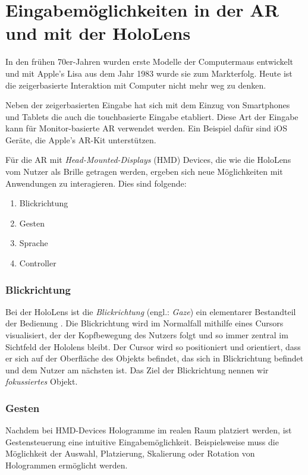 \section{Eingabemöglichkeiten in der AR und mit der HoloLens}
\label{sec:interaction-hololens}

In den frühen 70er-Jahren wurden erste Modelle der Computermaus entwickelt und mit Apple's Lisa aus dem Jahr 1983 wurde sie zum Markterfolg. Heute ist die zeigerbasierte Interaktion mit Computer nicht mehr weg zu denken.

Neben der zeigerbasierten Eingabe hat sich mit dem Einzug von Smartphones und Tablets die auch die touchbasierte Eingabe etabliert. Diese Art der Eingabe kann für Monitor-basierte AR verwendet werden. Ein Beispiel dafür sind iOS Geräte, die Apple's AR-Kit unterstützen.

Für die AR mit \textit{Head-Mounted-Displays} (HMD) Devices, die wie die HoloLens vom Nutzer als Brille getragen werden, ergeben sich neue Möglichkeiten mit Anwendungen zu interagieren. Dies sind folgende:

\begin{enumerate}
  \item Blickrichtung
  \item Gesten
  \item Sprache
  \item Controller
\end{enumerate}

\subsubsection*{Blickrichtung}
Bei der HoloLens ist die \textit{Blickrichtung} (engl.: \textit{Gaze}) ein elementarer Bestandteil der Bedienung \cite{windows2017interaction}. Die Blickrichtung wird im Normalfall mithilfe eines Cursors visualisiert, der der Kopfbewegung des Nutzers folgt und so immer zentral im Sichtfeld der Hololens bleibt. Der Cursor wird so positioniert und orientiert, dass er sich auf der Oberfläche des Objekts befindet, das sich in Blickrichtung befindet und dem Nutzer am nächsten ist. Das Ziel der Blickrichtung nennen wir \textit{fokussiertes} Objekt.

\subsubsection*{Gesten}
Nachdem bei HMD-Devices Hologramme im realen Raum platziert werden, ist Gestensteuerung eine intuitive Eingabemöglichkeit. Beispielsweise muss die Möglichkeit der Auswahl, Platzierung, Skalierung oder Rotation von Hologrammen ermöglicht werden.

